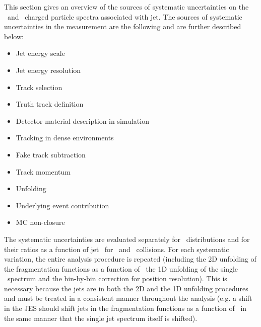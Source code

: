 
This section gives an overview of the sources of systematic uncertainties on the \pp\ and \pbpb\ charged particle spectra associated with jet.
The sources of systematic uncertainties in the measurement are the following and are further described below:

\begin{itemize}
\item Jet energy scale
\item Jet energy resolution
\item Track selection
\item Truth track definition
\item Detector material description in simulation
\item Tracking in dense environments
\item Fake track subtraction
\item Track momentum
\item Unfolding
\item Underlying event contribution
\item MC non-closure
\end{itemize}

The systematic uncertainties are evaluated separately for \Dptr\ distributions and for their ratios as a function of jet \pT\ for \pp\ and \pbpb\ collisions.
For each systematic variation, the entire analysis procedure is repeated (including the 2D unfolding of the fragmentation
functions as a function of \ptjet\, the 1D unfolding of the single \ptjet\ spectrum and the bin-by-bin correction for position resolution).
This is necessary because the jets are in both the 2D and the 1D unfolding procedures and must be treated in a consistent manner throughout the analysis (e.g.
a shift in the JES should 
shift jets in the fragmentation functions as a function of \ptjet\ in the same manner
that the single jet spectrum itself is shifted).



